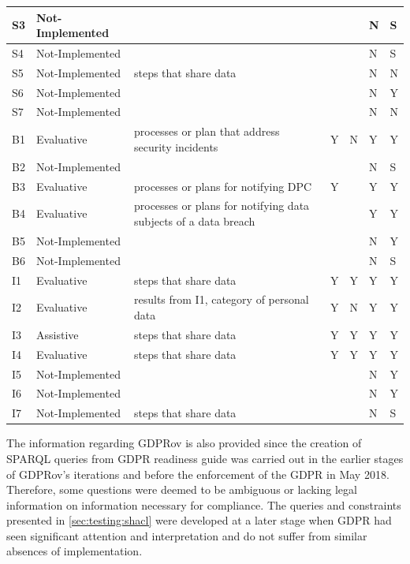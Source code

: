 \begin{table}[htbp]
\begin{tabularx}{\textwidth}{|l|l|X|l|l|l|l|}
S3 & Not-Implemented &  &  &  & N & S \\ \hline
S4 & Not-Implemented &  &  &  & N & S \\ \hline
S5 & Not-Implemented & steps that share data &  &  & N & N \\ \hline
S6 & Not-Implemented &  &  &  & N & Y \\ \hline
S7 & Not-Implemented &  &  &  & N & N \\ \hline
B1 & Evaluative & processes or plan that address security incidents & Y & N & Y & Y \\ \hline
B2 & Not-Implemented &  &  &  & N & S \\ \hline
B3 & Evaluative & processes or plans for notifying DPC & Y &  & Y & Y \\ \hline
B4 & Evaluative & processes or plans for notifying data subjects of a data breach &  &  & Y & Y \\ \hline
B5 & Not-Implemented &  &  &  & N & Y \\ \hline
B6 & Not-Implemented &  &  &  & N & S \\ \hline
I1 & Evaluative & steps that share data & Y & Y & Y & Y \\ \hline
I2 & Evaluative & results from I1, category of personal data & Y & N & Y & Y \\ \hline
I3 & Assistive & steps that share data & Y & Y & Y & Y \\ \hline
I4 & Evaluative & steps that share data & Y & Y & Y & Y \\ \hline
I5 & Not-Implemented &  &  &  & N & Y \\ \hline
I6 & Not-Implemented &  &  &  & N & Y \\ \hline
I7 & Not-Implemented & steps that share data &  &  & N & S \\ \hline
\end{tabularx}
\label{table:sparql:dpc-2}
\end{table}

The information regarding GDPRov is also provided since the creation of SPARQL queries from GDPR readiness guide was carried out in the earlier stages of GDPRov's iterations and before the enforcement of the GDPR in May 2018. Therefore, some questions were deemed to be ambiguous or lacking legal information on information necessary for compliance.
The queries and constraints presented in \autoref{sec:testing:shacl} were developed at a later stage when GDPR had seen significant attention and interpretation and do not suffer from similar absences of implementation.

